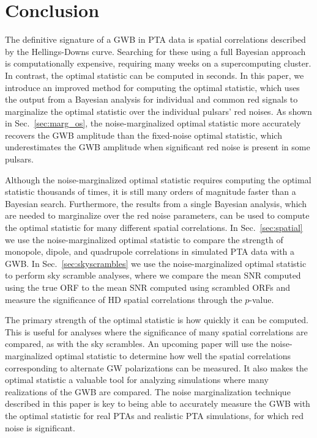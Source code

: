 \documentclass[twocolumn,aps,prd,superscriptaddress]{revtex4-1}
\begin{document}
\section{Conclusion}
\label{sec:conclusion}

The definitive signature of a GWB in PTA data is spatial correlations 
described by the Hellings-Downs curve. 
Searching for these using a full Bayesian approach is computationally expensive, 
requiring many weeks on a supercomputing cluster. 
In contrast, the optimal statistic can be computed in seconds. 
In this paper, we introduce an improved method 
for computing the optimal statistic, 
which uses the output from a Bayesian analysis 
for individual and common red signals 
to marginalize the optimal statistic over the individual pulsars' red noises. 
As shown in Sec.~\ref{sec:marg_os}, 
the noise-marginalized optimal statistic more accurately recovers the GWB amplitude 
than the fixed-noise optimal statistic, which underestimates the GWB amplitude 
when significant red noise is present in some pulsars.

Although the noise-marginalized optimal statistic 
requires computing the optimal statistic thousands of times, 
it is still many orders of magnitude faster than a Bayesian search. 
Furthermore, the results from a single Bayesian analysis, 
which are needed to marginalize over the red noise parameters, 
can be used to compute the optimal statistic for many different spatial correlations. 
In Sec.~\ref{sec:spatial} we use the noise-marginalized optimal statistic 
to compare the strength of monopole, dipole, and quadrupole correlations 
in simulated PTA data with a GWB. 
In Sec.~\ref{sec:skyscrambles} we use the noise-marginalized optimal statistic 
to perform sky scramble analyses, where we compare the mean SNR 
computed using the true ORF to the mean SNR computed using scrambled ORFs 
and measure the significance of HD spatial correlations through the $p$-value.

The primary strength of the optimal statistic is how quickly it can be computed. 
This is useful for analyses where the significance of many spatial correlations are compared, 
as with the sky scrambles. 
An upcoming paper will use the noise-marginalized optimal statistic 
to determine how well the spatial correlations corresponding to alternate GW polarizations 
can be measured. 
It also makes the optimal statistic a valuable tool for analyzing simulations 
where many realizations of the GWB are compared. 
The noise marginalization technique described in this paper is key 
to being able to accurately measure the GWB with the optimal statistic 
for real PTAs and realistic PTA simulations, 
for which red noise is significant.
\end{document}
